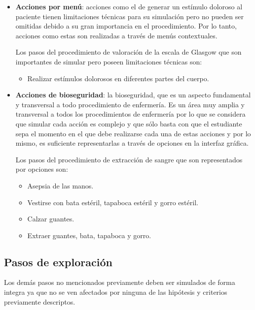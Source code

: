 \begin{itemize}
\item 
    \textbf{Acciones por menú}:  acciones como el de generar
    un estímulo doloroso al paciente tienen limitaciones técnicas para su
    simulación pero no pueden ser omitidas debido a su gran importancia en el
    procedimiento. Por lo tanto, acciones como estas son realizadas a través de
    menús contextuales.
    
    Los pasos del procedimiento de valoración de la escala de Glasgow que son
    importantes de simular pero poseen limitaciones técnicas son:
    \begin{itemize} 
    \item Realizar estímulos dolorosos en diferentes partes del cuerpo. 
    \end{itemize}
    
    

\item 
    \textbf{Acciones de bioseguridad}: la bioseguridad, que es un aspecto
    fundamental y transversal a todo procedimiento de enfermería. Es un área muy
    amplia y transversal a todos los procedimientos de enfermería por lo que se
    considera que simular cada acción es complejo y que sólo basta con que el
    estudiante sepa el momento en el que debe realizarse cada una de estas
    acciones y por lo mismo, es suficiente representarlas a través de opciones
    en la interfaz gráfica.
    
    Los pasos del procedimiento de extracción de sangre que son representados
    por opciones son:
    \begin{itemize}
        \item Asepsia de las manos.
        \item Vestirse con bata estéril, tapaboca estéril y gorro estéril.
        \item Calzar guantes.
        \item Extraer guantes, bata, tapaboca y gorro.
    \end{itemize}
    

\end{itemize}

\subsection{Pasos de exploración}

Los demás pasos no mencionados previamente deben ser simulados de forma 
integra ya que no se ven afectados por ninguna de las hipótesis y criterios previamente
descriptos.

